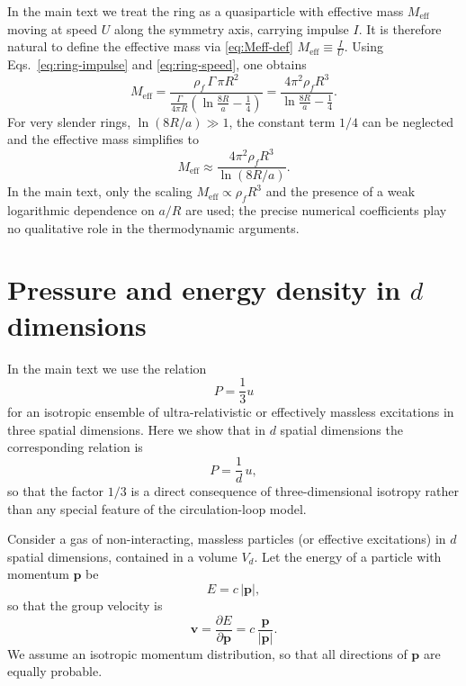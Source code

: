 \documentclass[11pt]{article}
\begin{document}
        In the main text we treat the ring as a quasiparticle with effective mass $M_{\mathrm{eff}}$
        moving at speed $U$ along the symmetry axis, carrying impulse $I$. It is therefore
        natural to define the effective mass via \ref{eq:Meff-def}
        \(          M_{\mathrm{eff}}            \equiv \frac{I}{U}.
        \)
        Using Eqs.~\eqref{eq:ring-impulse} and \eqref{eq:ring-speed}, one obtains
        \begin{equation}
            M_{\mathrm{eff}}
            = \frac{\rho_f \,\Gamma\, \pi R^2}
            {\displaystyle \frac{\Gamma}{4\pi R}
            \left(\ln\frac{8R}{a} - \frac{1}{4}\right)}
            = \frac{4\pi^2 \rho_f R^3}
            {\displaystyle \ln\frac{8R}{a} - \frac{1}{4}}.
            \label{eq:Meff-explicit}
        \end{equation}
        For very slender rings, $\ln(8R/a) \gg 1$, the constant term $1/4$ can be neglected and
        the effective mass simplifies to
        \begin{equation}
            M_{\mathrm{eff}}
            \approx \frac{4\pi^2 \rho_f R^3}{\ln(8R/a)}.
        \end{equation}
        In the main text, only the scaling $M_{\mathrm{eff}} \propto \rho_f R^3$ and the presence
        of a weak logarithmic dependence on $a/R$ are used; the precise numerical coefficients
        play no qualitative role in the thermodynamic arguments.

    \section{Pressure and energy density in $d$ dimensions}
    \label{app:P-u-over-d}

    In the main text we use the relation
    \begin{equation}
        P = \frac{1}{3} u
    \end{equation}
    for an isotropic ensemble of ultra-relativistic or effectively massless excitations
    in three spatial dimensions. Here we show that in $d$ spatial dimensions the corresponding
    relation is
    \begin{equation}
        P = \frac{1}{d}\,u,
    \end{equation}
    so that the factor $1/3$ is a direct consequence of three-dimensional isotropy rather
    than any special feature of the circulation-loop model.

    Consider a gas of non-interacting, massless particles (or effective excitations) in
    $d$ spatial dimensions, contained in a volume $V_d$. Let the energy of a particle with
    momentum $\boldsymbol{p}$ be
    \begin{equation}
        E = c\,|\boldsymbol{p}|,
    \end{equation}
    so that the group velocity is
    \begin{equation}
        \boldsymbol{v}
        = \frac{\partial E}{\partial \boldsymbol{p}}
        = c\,\frac{\boldsymbol{p}}{|\boldsymbol{p}|}.
    \end{equation}
    We assume an isotropic momentum distribution, so that all directions of $\boldsymbol{p}$
    are equally probable.
\end{document}
